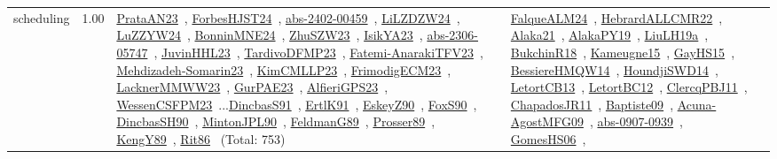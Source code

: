 {\begin{longtable}{p{3cm}r>{\raggedright\arraybackslash}p{6cm}>{\raggedright\arraybackslash}p{6cm}>{\raggedright\arraybackslash}p{8cm}}
\index{scheduling}\index{Scheduling!scheduling}scheduling &  1.00 & \href{../works/PrataAN23.pdf}{PrataAN23}~\cite{PrataAN23}, \href{../works/ForbesHJST24.pdf}{ForbesHJST24}~\cite{ForbesHJST24}, \href{../works/abs-2402-00459.pdf}{abs-2402-00459}~\cite{abs-2402-00459}, \href{../works/LiLZDZW24.pdf}{LiLZDZW24}~\cite{LiLZDZW24}, \href{../works/LuZZYW24.pdf}{LuZZYW24}~\cite{LuZZYW24}, \href{../works/BonninMNE24.pdf}{BonninMNE24}~\cite{BonninMNE24}, \href{../works/ZhuSZW23.pdf}{ZhuSZW23}~\cite{ZhuSZW23}, \href{../works/IsikYA23.pdf}{IsikYA23}~\cite{IsikYA23}, \href{../works/abs-2306-05747.pdf}{abs-2306-05747}~\cite{abs-2306-05747}, \href{../works/JuvinHHL23.pdf}{JuvinHHL23}~\cite{JuvinHHL23}, \href{../works/TardivoDFMP23.pdf}{TardivoDFMP23}~\cite{TardivoDFMP23}, \href{../works/Fatemi-AnarakiTFV23.pdf}{Fatemi-AnarakiTFV23}~\cite{Fatemi-AnarakiTFV23}, \href{../works/Mehdizadeh-Somarin23.pdf}{Mehdizadeh-Somarin23}~\cite{Mehdizadeh-Somarin23}, \href{../works/KimCMLLP23.pdf}{KimCMLLP23}~\cite{KimCMLLP23}, \href{../works/FrimodigECM23.pdf}{FrimodigECM23}~\cite{FrimodigECM23}, \href{../works/LacknerMMWW23.pdf}{LacknerMMWW23}~\cite{LacknerMMWW23}, \href{../works/GurPAE23.pdf}{GurPAE23}~\cite{GurPAE23}, \href{../works/AlfieriGPS23.pdf}{AlfieriGPS23}~\cite{AlfieriGPS23}, \href{../works/WessenCSFPM23.pdf}{WessenCSFPM23}~\cite{WessenCSFPM23}...\href{../works/DincbasS91.pdf}{DincbasS91}~\cite{DincbasS91}, \href{../works/ErtlK91.pdf}{ErtlK91}~\cite{ErtlK91}, \href{../works/EskeyZ90.pdf}{EskeyZ90}~\cite{EskeyZ90}, \href{../works/FoxS90.pdf}{FoxS90}~\cite{FoxS90}, \href{../works/DincbasSH90.pdf}{DincbasSH90}~\cite{DincbasSH90}, \href{../works/MintonJPL90.pdf}{MintonJPL90}~\cite{MintonJPL90}, \href{../works/FeldmanG89.pdf}{FeldmanG89}~\cite{FeldmanG89}, \href{../works/Prosser89.pdf}{Prosser89}~\cite{Prosser89}, \href{../works/KengY89.pdf}{KengY89}~\cite{KengY89}, \href{../works/Rit86.pdf}{Rit86}~\cite{Rit86} (Total: 753) & \href{../works/FalqueALM24.pdf}{FalqueALM24}~\cite{FalqueALM24}, \href{../works/HebrardALLCMR22.pdf}{HebrardALLCMR22}~\cite{HebrardALLCMR22}, \href{../works/Alaka21.pdf}{Alaka21}~\cite{Alaka21}, \href{../works/AlakaPY19.pdf}{AlakaPY19}~\cite{AlakaPY19}, \href{../works/LiuLH19a.pdf}{LiuLH19a}~\cite{LiuLH19a}, \href{../works/BukchinR18.pdf}{BukchinR18}~\cite{BukchinR18}, \href{../works/Kameugne15.pdf}{Kameugne15}~\cite{Kameugne15}, \href{../works/GayHS15.pdf}{GayHS15}~\cite{GayHS15}, \href{../works/BessiereHMQW14.pdf}{BessiereHMQW14}~\cite{BessiereHMQW14}, \href{../works/HoundjiSWD14.pdf}{HoundjiSWD14}~\cite{HoundjiSWD14}, \href{../works/LetortCB13.pdf}{LetortCB13}~\cite{LetortCB13}, \href{../works/LetortBC12.pdf}{LetortBC12}~\cite{LetortBC12}, \href{../works/ClercqPBJ11.pdf}{ClercqPBJ11}~\cite{ClercqPBJ11}, \href{../works/ChapadosJR11.pdf}{ChapadosJR11}~\cite{ChapadosJR11}, \href{../works/Baptiste09.pdf}{Baptiste09}~\cite{Baptiste09}, \href{../works/Acuna-AgostMFG09.pdf}{Acuna-AgostMFG09}~\cite{Acuna-AgostMFG09}, \href{../works/abs-0907-0939.pdf}{abs-0907-0939}~\cite{abs-0907-0939}, \href{../works/GomesHS06.pdf}{GomesHS06}~\cite{GomesHS06}, 
\end{longtable}}
